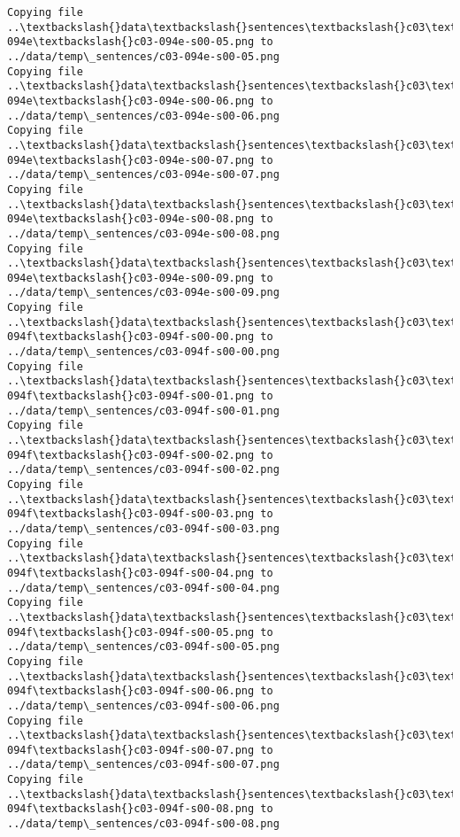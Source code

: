 \documentclass[11pt]{article}
\begin{document}
\begin{Verbatim}[commandchars=\\\{\}]
Copying file ..\textbackslash{}data\textbackslash{}sentences\textbackslash{}c03\textbackslash{}c03-094e\textbackslash{}c03-094e-s00-05.png to
../data/temp\_sentences/c03-094e-s00-05.png
Copying file ..\textbackslash{}data\textbackslash{}sentences\textbackslash{}c03\textbackslash{}c03-094e\textbackslash{}c03-094e-s00-06.png to
../data/temp\_sentences/c03-094e-s00-06.png
Copying file ..\textbackslash{}data\textbackslash{}sentences\textbackslash{}c03\textbackslash{}c03-094e\textbackslash{}c03-094e-s00-07.png to
../data/temp\_sentences/c03-094e-s00-07.png
Copying file ..\textbackslash{}data\textbackslash{}sentences\textbackslash{}c03\textbackslash{}c03-094e\textbackslash{}c03-094e-s00-08.png to
../data/temp\_sentences/c03-094e-s00-08.png
Copying file ..\textbackslash{}data\textbackslash{}sentences\textbackslash{}c03\textbackslash{}c03-094e\textbackslash{}c03-094e-s00-09.png to
../data/temp\_sentences/c03-094e-s00-09.png
Copying file ..\textbackslash{}data\textbackslash{}sentences\textbackslash{}c03\textbackslash{}c03-094f\textbackslash{}c03-094f-s00-00.png to
../data/temp\_sentences/c03-094f-s00-00.png
Copying file ..\textbackslash{}data\textbackslash{}sentences\textbackslash{}c03\textbackslash{}c03-094f\textbackslash{}c03-094f-s00-01.png to
../data/temp\_sentences/c03-094f-s00-01.png
Copying file ..\textbackslash{}data\textbackslash{}sentences\textbackslash{}c03\textbackslash{}c03-094f\textbackslash{}c03-094f-s00-02.png to
../data/temp\_sentences/c03-094f-s00-02.png
Copying file ..\textbackslash{}data\textbackslash{}sentences\textbackslash{}c03\textbackslash{}c03-094f\textbackslash{}c03-094f-s00-03.png to
../data/temp\_sentences/c03-094f-s00-03.png
Copying file ..\textbackslash{}data\textbackslash{}sentences\textbackslash{}c03\textbackslash{}c03-094f\textbackslash{}c03-094f-s00-04.png to
../data/temp\_sentences/c03-094f-s00-04.png
Copying file ..\textbackslash{}data\textbackslash{}sentences\textbackslash{}c03\textbackslash{}c03-094f\textbackslash{}c03-094f-s00-05.png to
../data/temp\_sentences/c03-094f-s00-05.png
Copying file ..\textbackslash{}data\textbackslash{}sentences\textbackslash{}c03\textbackslash{}c03-094f\textbackslash{}c03-094f-s00-06.png to
../data/temp\_sentences/c03-094f-s00-06.png
Copying file ..\textbackslash{}data\textbackslash{}sentences\textbackslash{}c03\textbackslash{}c03-094f\textbackslash{}c03-094f-s00-07.png to
../data/temp\_sentences/c03-094f-s00-07.png
Copying file ..\textbackslash{}data\textbackslash{}sentences\textbackslash{}c03\textbackslash{}c03-094f\textbackslash{}c03-094f-s00-08.png to
../data/temp\_sentences/c03-094f-s00-08.png

\end{Verbatim}
\end{document}
